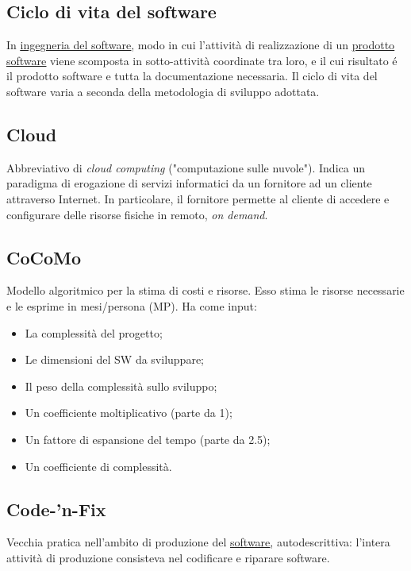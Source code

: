 	\subsection{Ciclo di vita del software}
	\label{sec:ciclodivita}
	In \underline{\hyperref[sec:swe]{ingegneria del software}}, modo in cui l'attività di realizzazione di un \underline{\hyperref[sec:prodottosoftware]{prodotto software}} viene scomposta in sotto-attività coordinate tra loro, e il cui risultato é il prodotto software e tutta la documentazione necessaria. Il ciclo di vita del software varia a seconda della metodologia di sviluppo adottata.


	
	\subsection{Cloud}
	\label{sec:cloud}
	Abbreviativo di \emph{cloud computing} ("computazione sulle nuvole"). Indica un paradigma di erogazione di servizi informatici da un fornitore ad un cliente attraverso Internet. In particolare, il fornitore permette al cliente di accedere e configurare delle risorse fisiche in remoto, \emph{on demand}.

	
	\subsection{CoCoMo}
	\label{sec:cocomo}
	Modello algoritmico per la stima di costi e risorse. Esso stima le risorse necessarie e le esprime in mesi/persona (MP). Ha come input:
	\begin{itemize}
	\item La complessità del progetto;
	\item Le dimensioni del SW da sviluppare;
	\item Il peso della complessità sullo sviluppo;
	\item Un coefficiente moltiplicativo (parte da 1);
	\item Un fattore di espansione del tempo (parte da 2.5);
	\item Un coefficiente di complessità.
	\end{itemize}

	
	\subsection{Code-'n-Fix}
	\label{sec:codenfix}
	Vecchia pratica nell'ambito di produzione del \underline{\hyperref[sec:prodottosoftware]{software}}, autodescrittiva: l'intera attività di produzione consisteva nel codificare e riparare software.


